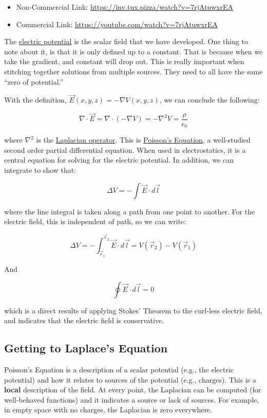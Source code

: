 \begin{itemize}
\tightlist
\item
  Non-Commercial Link: \url{https://inv.tux.pizza/watch?v=7rjAtuwxrEA}
\item
  Commercial Link: \url{https://youtube.com/watch?v=7rjAtuwxrEA}
\end{itemize}

The \href{https://en.wikipedia.org/wiki/Electric_potential}{electric
potential} is the scalar field that we have developed. One thing to note
about it, is that it is only defined up to a constant. That is because
when we take the gradient, and constant will drop out. This is really
important when stitching together solutions from multiple sources. They
need to all have the same ``zero of potential.''

With the definition, \(\vec{E}(x,y,z) = -\nabla V(x,y,z)\), we can
conclude the following:

\[\nabla \cdot \vec{E} = \nabla \cdot (-\nabla V) = -\nabla^2 V = \frac{\rho}{\epsilon_0}\]

where \(\nabla^2\) is the
\href{https://en.wikipedia.org/wiki/Laplace_operator}{Laplacian
operator}. This is
\href{https://en.wikipedia.org/wiki/Poisson\%27s_equation}{Poisson's
Equation}, a well-studied second order partial differential equation.
When used in electrostatics, it is a central equation for solving for
the electric potential. In addition, we can integrate to show that:

\[\Delta V = -\int \vec{E} \cdot d\vec{l}\]

where the line integral is taken along a path from one point to another.
For the electric field, this is independent of path, so we can write:

\[\Delta V = -\int_{\vec{r}_1}^{\vec{r}_2} \vec{E} \cdot d\vec{l} = V(\vec{r}_2) - V(\vec{r}_1)\]

And

\[\oint \vec{E} \cdot d\vec{l} = 0\]

which is a direct results of applying Stokes' Theorem to the curl-less
electric field, and indicates that the electric field is conservative.

\subsection{Getting to Laplace's
Equation}\label{getting-to-laplaces-equation}

Poisson's Equation is a description of a scalar potential (e.g., the
electric potential) and how it relates to sources of the potential
(e.g., charges). This is a \textbf{local} description of the field. At
every point, the Laplacian can be computed (for well-behaved functions)
and it indicates a source or lack of sources. For example, in empty
space with no charges, the Laplacian is zero everywhere.

